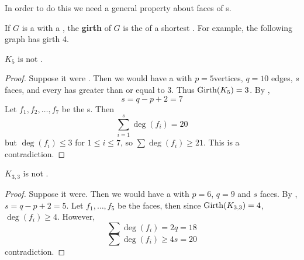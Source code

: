 \documentclass[english, 11pt]{article}
\begin{document}
 In order to do this we need a general property about faces of  s.

 \begin{defn}[girth]\label{girth}
 If $G$ is a  with a , the \textbf{girth} of $G$ is the  of a shortest . For example, the following graph has girth 4.
 \begin{center}
\end{center}
 \end{defn}

 \begin{thrm}
   $K_5$ is not .
 \end{thrm}

 \begin{proof}
   Suppose it were . Then we would have a  with $p = 5$vertices, $q = 10$ edges, $s$ faces, and every  has  greater than or equal to 3. Thus $\operatorname{Girth}(K_5) = 3$. By ,
   \[ s = q - p + 2 = 7 \]
   Let $f_1, f_2, \ldots, f_7$ be the s. Then
   \[ \sum_{i = 1}^s \deg(f_i) = 20 \]
   but $\deg(f_i) \leq 3$ for $1 \leq i \leq 7$, so $\sum \deg(f_i) \geq 21$. This is a contradiction.
 \end{proof}

 \begin{thrm}
   $K_{3,3}$ is not .
 \end{thrm}

 \begin{proof}
   Suppose it were. Then we would have a  with $p = 6$, $q = 9$ and $s$ faces. By , $s = q - p + 2 = 5$. Let $f_1, \ldots, f_5$ be the faces, then since $\operatorname{Girth}(K_{3,3}) = 4$,  $\deg(f_i) \geq 4$. However,
   \[ \sum \deg (f_i) = 2q = 18 \]
   \[ \sum \deg (f_i) \geq 4s = 20 \]
   contradiction.
 \end{proof}
\end{document}
